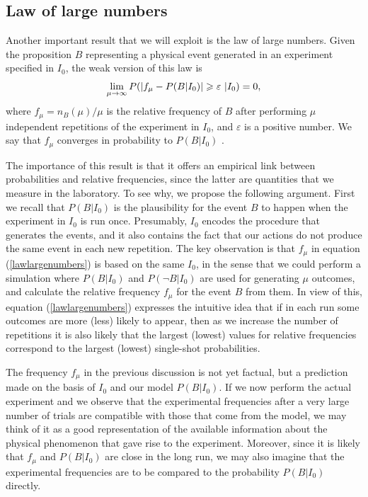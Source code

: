 \subsection{Law of large numbers}
\label{subsec:lln}

Another important result that we will exploit is the law of large numbers. Given the proposition $B$ representing a physical event generated in an experiment specified in $I_0$, the weak version of this law is \cite{ballentine2016, rosenthal2006} 
\begin{equation}
\lim_{\mu \to \infty} P(\abs{f_\mu - P(B|I_0)} \geqslant \varepsilon~ |I_0) = 0,
\label{lawlargenumbers}
\end{equation}
where $f_\mu = n_B(\mu)/\mu$ is the relative frequency of $B$ after performing $\mu$ independent repetitions of the experiment in $I_0$, and $\varepsilon$ is a positive number. We say that $f_\mu$ converges in probability to $P(B|I_0)$ \cite{rosenthal2006}.

The importance of this result is that it offers an empirical link between probabilities and relative frequencies, since the latter are quantities that we measure in the laboratory. To see why, we propose the following argument. First we recall that $P(B|I_0)$ is the plausibility for the event $B$ to happen when the experiment in $I_0$ is run once. Presumably, $I_0$ encodes the procedure that generates the events, and it also contains the fact that our actions do not produce the same event in each new repetition. The key observation is that $f_\mu$ in equation (\ref{lawlargenumbers}) is based on the same $I_0$, in the sense that we could perform a simulation where $P(B|I_0)$ and $P(\neg B|I_0)$ are used for generating $\mu$ outcomes, and calculate the relative frequency $f_\mu$ for the event $B$ from them. In view of this, equation (\ref{lawlargenumbers}) expresses the intuitive idea that if in each run some outcomes are more (less) likely to appear, then as we increase the number of repetitions it is also likely that the largest (lowest) values for relative frequencies correspond to the largest (lowest) single-shot probabilities.

The frequency $f_\mu$ in the previous discussion is not yet factual, but a prediction made on the basis of $I_0$ and our model $P(B|I_0)$. If we now perform the actual experiment and we observe that the experimental frequencies after a very large number of trials are compatible with those that come from the model, we may think of it as a good representation of the available information about the physical phenomenon that gave rise to the experiment. Moreover, since it is likely that $f_\mu$ and $P(B|I_0)$ are close in the long run, we may also imagine that the experimental frequencies are to be compared to the probability $P(B|I_0)$ directly.

